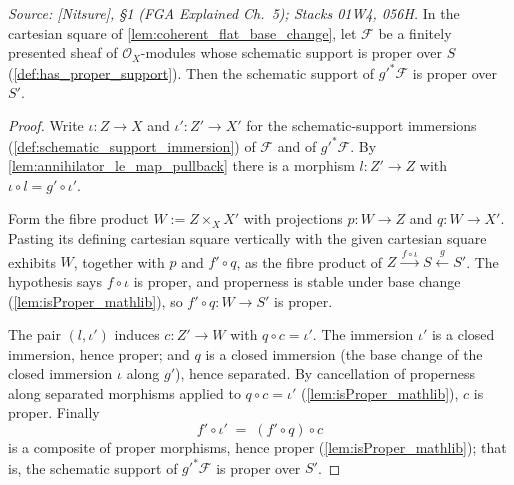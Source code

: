 \begin{lemma}
  \label{lem:proper_support_base_change}
  \textit{Source: [Nitsure], \S 1 (FGA Explained Ch.~5); Stacks 01W4, 056H.}
  In the cartesian square of \cref{lem:coherent_flat_base_change}, let
  \(\mathcal{F}\) be a finitely presented sheaf of
  \(\mathcal{O}_X\)-modules whose schematic support is proper over \(S\)
  (\cref{def:has_proper_support}).  Then the schematic support of
  \(g'^* \mathcal{F}\) is proper over \(S'\).
\end{lemma}
\begin{proof}\leanok
  Write \(\iota : Z \to X\) and \(\iota' : Z' \to X'\) for the
  schematic-support immersions (\cref{def:schematic_support_immersion}) of
  \(\mathcal{F}\) and of \(g'^* \mathcal{F}\).  By
  \cref{lem:annihilator_le_map_pullback} there is a morphism
  \(l : Z' \to Z\) with \(\iota \circ l = g' \circ \iota'\).

  Form the fibre product \(W := Z \times_X X'\) with projections
  \(p : W \to Z\) and \(q : W \to X'\).  Pasting its defining cartesian
  square vertically with the given cartesian square exhibits \(W\), together
  with \(p\) and \(f' \circ q\), as the fibre product of
  \(Z \xrightarrow{\,f \circ \iota\,} S \xleftarrow{\,g\,} S'\).  The
  hypothesis says \(f \circ \iota\) is proper, and properness is stable under
  base change (\cref{lem:isProper_mathlib}), so \(f' \circ q : W \to S'\) is
  proper.

  The pair \((l, \iota')\) induces \(c : Z' \to W\) with
  \(q \circ c = \iota'\).  The immersion \(\iota'\) is a closed immersion,
  hence proper; and \(q\) is a closed immersion (the base change of the
  closed immersion \(\iota\) along \(g'\)), hence separated.  By cancellation
  of properness along separated morphisms applied to \(q \circ c = \iota'\)
  (\cref{lem:isProper_mathlib}), \(c\) is proper.  Finally
  \[
    f' \circ \iota' \;=\; (f' \circ q) \circ c
  \]
  is a composite of proper morphisms, hence proper
  (\cref{lem:isProper_mathlib}); that is, the schematic support of
  \(g'^* \mathcal{F}\) is proper over \(S'\).
\end{proof}

